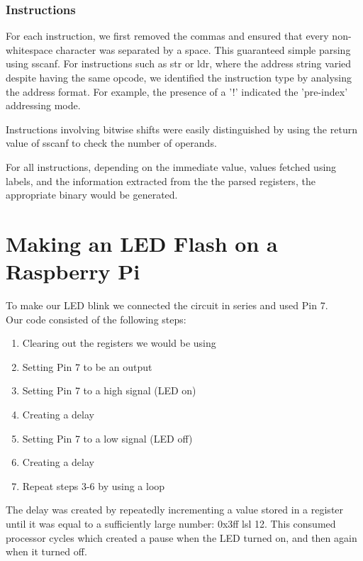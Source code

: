 \documentclass{article}
\begin{document}
\subsubsection{Instructions}

For each instruction, we first removed the commas and ensured that every non-whitespace character was separated by a space. This guaranteed simple parsing using sscanf. For instructions such as str or ldr, where the address string varied despite having the same opcode, we identified the instruction type by analysing the address format. For example, the presence of a '!' indicated the 'pre-index' addressing mode.

Instructions involving bitwise shifts were easily distinguished by using the return value of sscanf to check the number of operands.

For all instructions, depending on the immediate value, values fetched using labels, and the information extracted from the the parsed registers, the appropriate binary would be generated.\\

\section{Making an LED Flash on a Raspberry Pi}

To make our LED blink we connected the circuit in series and used Pin 7.\\

Our code consisted of the following steps:
\begin{enumerate} [noitemsep]
    \item Clearing out the registers we would be using
    \item Setting Pin 7 to be an output
    \item Setting Pin 7 to a high signal (LED on)
    \item Creating a delay
    \item Setting Pin 7 to a low signal (LED off)
    \item Creating a delay
    \item Repeat steps 3-6 by using a loop
\end{enumerate}

The delay was created by repeatedly incrementing a value stored in a register until it was equal to a sufficiently large number: 0x3ff lsl 12. This consumed processor cycles which created a pause when the LED turned on, and then again when it turned off. \\
\end{document}
